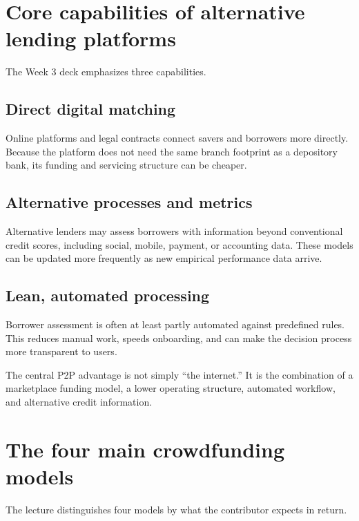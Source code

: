 \section{Core capabilities of alternative lending platforms}

The Week 3 deck emphasizes three capabilities.

\subsection{Direct digital matching}

Online platforms and legal contracts connect savers and borrowers more directly. Because the platform does not need the same branch footprint as a depository bank, its funding and servicing structure can be cheaper.

\subsection{Alternative processes and metrics}

Alternative lenders may assess borrowers with information beyond conventional credit scores, including social, mobile, payment, or accounting data. These models can be updated more frequently as new empirical performance data arrive.

\subsection{Lean, automated processing}

Borrower assessment is often at least partly automated against predefined rules. This reduces manual work, speeds onboarding, and can make the decision process more transparent to users.

\begin{keyidea}
The central P2P advantage is not simply ``the internet.'' It is the combination of a marketplace funding model, a lower operating structure, automated workflow, and alternative credit information.
\end{keyidea}

\section{The four main crowdfunding models}

The lecture distinguishes four models by what the contributor expects in return.

